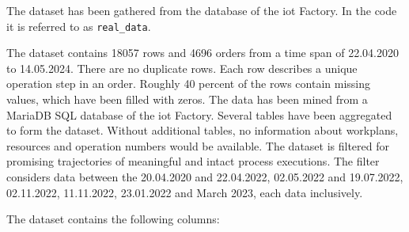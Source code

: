 The dataset has been gathered from the database of the \gls{iot} Factory. In the code it is referred to as \texttt{real\_data}.

The dataset contains 18057 rows and 4696 orders from a time span of 22.04.2020 to 14.05.2024. There are no duplicate rows. Each row describes a unique operation step in an order. Roughly 40 percent of the rows contain missing values, which have been filled with zeros. The data has been mined from a MariaDB SQL database of the \gls{iot} Factory. Several tables have been aggregated to form the dataset. Without additional tables, no information about workplans, resources and operation numbers would be available. The dataset is filtered for promising trajectories of meaningful and intact process executions. The filter considers data between the 20.04.2020 and 22.04.2022, 02.05.2022 and 19.07.2022, 02.11.2022, 11.11.2022, 23.01.2022 and March 2023, each data inclusively.

The dataset contains the following columns:

